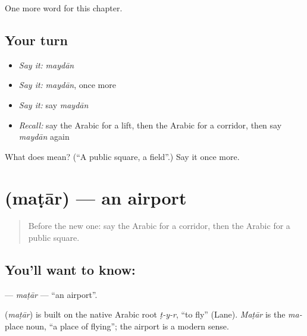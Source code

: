 \begin{grammarlens}[title={What you've built}]
One more word for this chapter.
\end{grammarlens}

\subsection*{Your turn}
\begin{itemize}
\raggedright
  \item \emph{Say it:} \emph{maydān}
  \item \emph{Say it:} \emph{maydān}, once more
  \item \emph{Say it:} say \emph{maydān}
  \item \emph{Recall:} say the Arabic for a lift, then the Arabic for a corridor, then say \emph{maydān} again
\end{itemize}

\begin{tcolorbox}[breakable,colback=teal!4,colframe=teal!35!black,title={Before you move on}]
What does  mean? (\textquotedblleft{}A public square, a field\textquotedblright{}.) Say it once more.
\end{tcolorbox}
\section[\texorpdfstring{\ar{مطار} (maṭār)}{مطار (maṭār)}]{ (maṭār) — an airport}

\label{lesson:AR-C100-matar}



\begin{quote}
Before the new one: say the Arabic for a corridor, then the Arabic for a public square.
\end{quote}

\subsection*{You'll want to know: }
\textbf{} — \emph{maṭār} — \textquotedblleft{}an airport\textquotedblright{}.

\begin{cousinweb}
\textbf{} (\emph{maṭār}) is built on the native Arabic root \emph{ṭ-y-r}, \textquotedblleft{}to fly\textquotedblright{} (Lane). \emph{Maṭār} is the \emph{ma-} place noun, \textquotedblleft{}a place of flying\textquotedblright{}; the airport is a modern sense.
\end{cousinweb}

